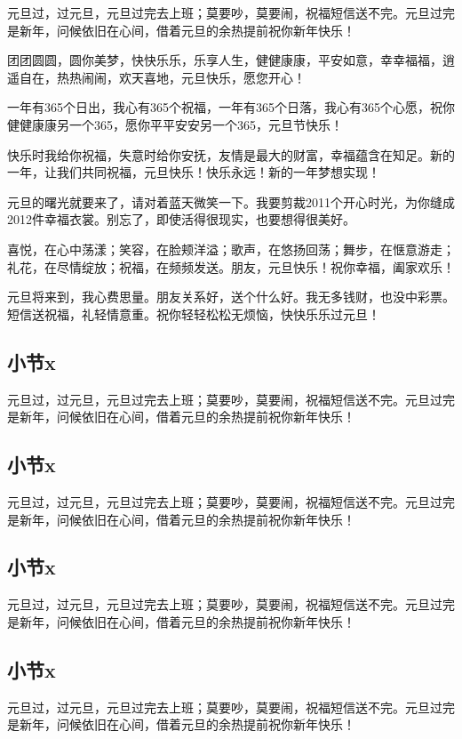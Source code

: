 元旦过，过元旦，元旦过完去上班；莫要吵，莫要闹，祝福短信送不完。元旦过完是新年，问候依旧在心间，借着元旦的余热提前祝你新年快乐！

团团圆圆，圆你美梦，快快乐乐，乐享人生，健健康康，平安如意，幸幸福福，逍遥自在，热热闹闹，欢天喜地，元旦快乐，愿您开心！

一年有365个日出，我心有365个祝福，一年有365个日落，我心有365个心愿，祝你健健康康另一个365，愿你平平安安另一个365，元旦节快乐！

快乐时我给你祝福，失意时给你安抚，友情是最大的财富，幸福蕴含在知足。新的一年，让我们共同祝福，元旦快乐！快乐永远！新的一年梦想实现！

元旦的曙光就要来了，请对着蓝天微笑一下。我要剪裁2011个开心时光，为你缝成2012件幸福衣裳。别忘了，即使活得很现实，也要想得很美好。

喜悦，在心中荡漾；笑容，在脸颊洋溢；歌声，在悠扬回荡；舞步，在惬意游走；礼花，在尽情绽放；祝福，在频频发送。朋友，元旦快乐！祝你幸福，阖家欢乐！

元旦将来到，我心费思量。朋友关系好，送个什么好。我无多钱财，也没中彩票。短信送祝福，礼轻情意重。祝你轻轻松松无烦恼，快快乐乐过元旦！

\subsection{小节x}

元旦过，过元旦，元旦过完去上班；莫要吵，莫要闹，祝福短信送不完。元旦过完是新年，问候依旧在心间，借着元旦的余热提前祝你新年快乐！

\subsection{小节x}

元旦过，过元旦，元旦过完去上班；莫要吵，莫要闹，祝福短信送不完。元旦过完是新年，问候依旧在心间，借着元旦的余热提前祝你新年快乐！

\subsection{小节x}

元旦过，过元旦，元旦过完去上班；莫要吵，莫要闹，祝福短信送不完。元旦过完是新年，问候依旧在心间，借着元旦的余热提前祝你新年快乐！

\subsection{小节x}

元旦过，过元旦，元旦过完去上班；莫要吵，莫要闹，祝福短信送不完。元旦过完是新年，问候依旧在心间，借着元旦的余热提前祝你新年快乐！

